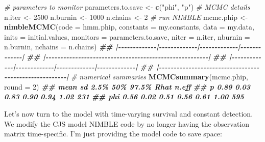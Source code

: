 \documentclass[
  12pt,
]{krantz}
\newenvironment{Shaded}{\begin{snugshade}}{\end{snugshade}}
\newcommand{\AttributeTok}[1]{\textcolor[rgb]{0.13,0.29,0.53}{#1}}
\newcommand{\CommentTok}[1]{\textcolor[rgb]{0.56,0.35,0.01}{\textit{#1}}}
\newcommand{\DecValTok}[1]{\textcolor[rgb]{0.00,0.00,0.81}{#1}}
\newcommand{\DocumentationTok}[1]{\textcolor[rgb]{0.56,0.35,0.01}{\textbf{\textit{#1}}}}
\newcommand{\FunctionTok}[1]{\textcolor[rgb]{0.13,0.29,0.53}{\textbf{#1}}}
\newcommand{\NormalTok}[1]{#1}
\newcommand{\OtherTok}[1]{\textcolor[rgb]{0.56,0.35,0.01}{#1}}
\newcommand{\StringTok}[1]{\textcolor[rgb]{0.31,0.60,0.02}{#1}}
\begin{document}
\begin{Shaded}
\begin{Highlighting}[]
\CommentTok{\# parameters to monitor}
\NormalTok{parameters.to.save }\OtherTok{\textless{}{-}} \FunctionTok{c}\NormalTok{(}\StringTok{"phi"}\NormalTok{, }\StringTok{"p"}\NormalTok{)}
\CommentTok{\# MCMC details}
\NormalTok{n.iter }\OtherTok{\textless{}{-}} \DecValTok{2500}
\NormalTok{n.burnin }\OtherTok{\textless{}{-}} \DecValTok{1000}
\NormalTok{n.chains }\OtherTok{\textless{}{-}} \DecValTok{2}
\CommentTok{\# run NIMBLE}
\NormalTok{mcmc.phip }\OtherTok{\textless{}{-}} \FunctionTok{nimbleMCMC}\NormalTok{(}\AttributeTok{code =}\NormalTok{ hmm.phip, }
                        \AttributeTok{constants =}\NormalTok{ my.constants,}
                        \AttributeTok{data =}\NormalTok{ my.data,              }
                        \AttributeTok{inits =}\NormalTok{ initial.values,}
                        \AttributeTok{monitors =}\NormalTok{ parameters.to.save,}
                        \AttributeTok{niter =}\NormalTok{ n.iter,}
                        \AttributeTok{nburnin =}\NormalTok{ n.burnin, }
                        \AttributeTok{nchains =}\NormalTok{ n.chains)}
\DocumentationTok{\#\# |{-}{-}{-}{-}{-}{-}{-}{-}{-}{-}{-}{-}{-}|{-}{-}{-}{-}{-}{-}{-}{-}{-}{-}{-}{-}{-}|{-}{-}{-}{-}{-}{-}{-}{-}{-}{-}{-}{-}{-}|{-}{-}{-}{-}{-}{-}{-}{-}{-}{-}{-}{-}{-}|}
\DocumentationTok{\#\# |{-}{-}{-}{-}{-}{-}{-}{-}{-}{-}{-}{-}{-}{-}{-}{-}{-}{-}{-}{-}{-}{-}{-}{-}{-}{-}{-}{-}{-}{-}{-}{-}{-}{-}{-}{-}{-}{-}{-}{-}{-}{-}{-}{-}{-}{-}{-}{-}{-}{-}{-}{-}{-}{-}{-}|}
\DocumentationTok{\#\# |{-}{-}{-}{-}{-}{-}{-}{-}{-}{-}{-}{-}{-}|{-}{-}{-}{-}{-}{-}{-}{-}{-}{-}{-}{-}{-}|{-}{-}{-}{-}{-}{-}{-}{-}{-}{-}{-}{-}{-}|{-}{-}{-}{-}{-}{-}{-}{-}{-}{-}{-}{-}{-}|}
\DocumentationTok{\#\# |{-}{-}{-}{-}{-}{-}{-}{-}{-}{-}{-}{-}{-}{-}{-}{-}{-}{-}{-}{-}{-}{-}{-}{-}{-}{-}{-}{-}{-}{-}{-}{-}{-}{-}{-}{-}{-}{-}{-}{-}{-}{-}{-}{-}{-}{-}{-}{-}{-}{-}{-}{-}{-}{-}{-}|}
\CommentTok{\# numerical summaries}
\FunctionTok{MCMCsummary}\NormalTok{(mcmc.phip, }\AttributeTok{round =} \DecValTok{2}\NormalTok{)}
\DocumentationTok{\#\#     mean   sd 2.5\%  50\% 97.5\% Rhat n.eff}
\DocumentationTok{\#\# p   0.89 0.03 0.83 0.90  0.94 1.02   231}
\DocumentationTok{\#\# phi 0.56 0.02 0.51 0.56  0.61 1.00   595}
\end{Highlighting}
\end{Shaded}

Let's now turn to the model with time-varying survival and constant detection. We modify the CJS model NIMBLE code by no longer having the observation matrix time-specific. I'm just providing the model code to save space:
\end{document}
